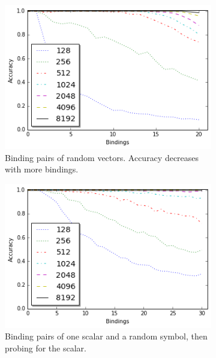 \documentclass[conference]{IEEEtran}
\begin{document}
		\begin{figure}[th!]
			\begin{subfigure}{0.45\columnwidth}
				\center
				\includegraphics[width=1\columnwidth]{img/capacity.png}
				\caption{Binding pairs of random vectors. Accuracy decreases with more bindings.}
				\label{fig:capacity}
			\end{subfigure}
			\begin{subfigure}{0.45\columnwidth}
				\center
				\includegraphics[width=1\columnwidth]{img/capacity_scalar_30.png}
				\caption{Binding pairs of one scalar and a random symbol, then probing for the scalar.}
				\label{fig:capacity_scalar}
			\end{subfigure}	
			\center
			\begin{subfigure}{0.45\columnwidth}
				\center

\end{subfigure}
\end{figure}
\end{document}
